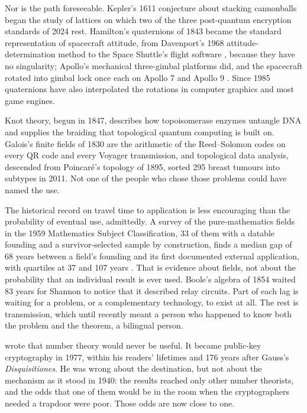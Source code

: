 \documentclass[11pt]{article}
\theoremstyle{definition}
\theoremstyle{remark}
\begin{document}
Nor is the path foreseeable. Kepler's 1611 conjecture about stacking cannonballs began the study of lattices on which two of the three post-quantum encryption standards of 2024 rest. Hamilton's quaternions of 1843 became the standard representation of spacecraft attitude, from Davenport's 1968 attitude-determination method \citep{davenport1968} to the Space Shuttle's flight software \citep{yazell2009}, because they have no singularity; Apollo's mechanical three-gimbal platforms did, and the spacecraft rotated into gimbal lock once each on Apollo 7 and Apollo 9 \citep{hoag1969}. Since 1985 quaternions have also interpolated the rotations in computer graphics and most game engines.

Knot theory, begun in 1847, describes how topoisomerase enzymes untangle DNA and supplies the braiding that topological quantum computing is built on. Galois's finite fields of 1830 are the arithmetic of the Reed--Solomon codes on every QR code and every Voyager transmission, and topological data analysis, descended from Poincar\'e's topology of 1895, sorted 295 breast tumours into subtypes in 2011. Not one of the people who chose those problems could have named the use.

The historical record on travel time to application is less encouraging than the probability of eventual use, admittedly. A survey of the pure-mathematics fields in the 1959 Mathematics Subject Classification, 33 of them with a datable founding and a survivor-selected sample by construction, finds a median gap of 68 years between a field's founding and its first documented external application, with quartiles at 37 and 107 years \citep{cotton2026pure}. That is evidence about fields, not about the probability that an individual result is ever used. Boole's algebra of 1854 waited 83 years for Shannon to notice that it described relay circuits. Part of each lag is waiting for a problem, or a complementary technology, to exist at all. The rest is transmission, which until recently meant a person who happened to know both the problem and the theorem, a bilingual person.

\citet{hardy1940} wrote that number theory would never be useful. It became public-key cryptography in 1977, within his readers' lifetimes and 176 years after Gauss's \emph{Disquisitiones}. He was wrong about the destination, but not about the mechanism as it stood in 1940: the results reached only other number theorists, and the odds that one of them would be in the room when the cryptographers needed a trapdoor were poor. Those odds are now close to one.
\end{document}
